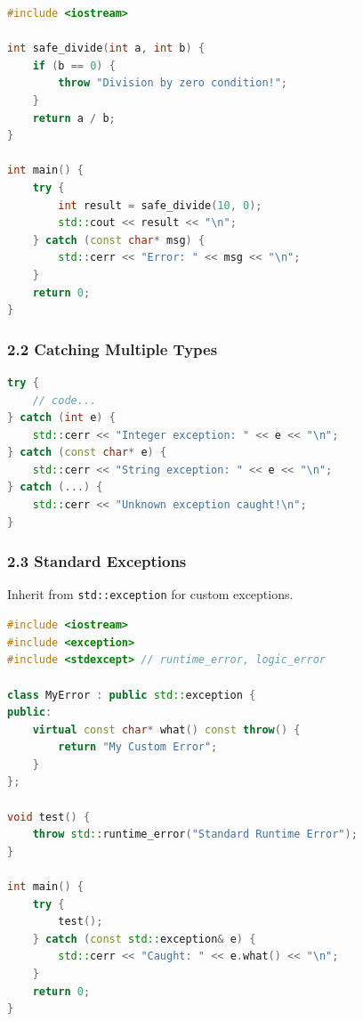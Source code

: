\begin{lstlisting}[language={C++}]
#include <iostream>

int safe_divide(int a, int b) {
    if (b == 0) {
        throw "Division by zero condition!";
    }
    return a / b;
}

int main() {
    try {
        int result = safe_divide(10, 0);
        std::cout << result << "\n";
    } catch (const char* msg) {
        std::cerr << "Error: " << msg << "\n";
    }
    return 0;
}
\end{lstlisting}

\hypertarget{catching-multiple-types}{%
\subsubsection{2.2 Catching Multiple
Types}\label{catching-multiple-types}}

\begin{lstlisting}[language={C++}]
try {
    // code...
} catch (int e) {
    std::cerr << "Integer exception: " << e << "\n";
} catch (const char* e) {
    std::cerr << "String exception: " << e << "\n";
} catch (...) {
    std::cerr << "Unknown exception caught!\n";
}
\end{lstlisting}

\hypertarget{standard-exceptions}{%
\subsubsection{2.3 Standard Exceptions}\label{standard-exceptions}}

Inherit from \passthrough{\lstinline!std::exception!} for custom
exceptions.

\begin{lstlisting}[language={C++}]
#include <iostream>
#include <exception>
#include <stdexcept> // runtime_error, logic_error

class MyError : public std::exception {
public:
    virtual const char* what() const throw() {
        return "My Custom Error";
    }
};

void test() {
    throw std::runtime_error("Standard Runtime Error");
}

int main() {
    try {
        test();
    } catch (const std::exception& e) {
        std::cerr << "Caught: " << e.what() << "\n";
    }
    return 0;
}
\end{lstlisting}

